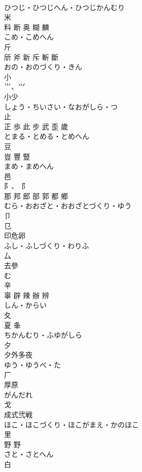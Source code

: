 \documentclass[8pt]{extreport}
\begin{document}
\begin{CJK}{UTF8}{min}
\\	ひつじ・ひつじへん・ひつじかんむり	
\\	米	
\\	料 断 奥 糊 麟	
\\	こめ・こめへん	
\\	斤	
\\	斦 斧 新 斥 斬 斷	
\\	おの・おのづくり・きん	
\\	小	
\\	⺌、⺍ 
\\	小少	
\\	しょう・ちいさい・なおがしら・つ	
\\	止	
\\	正 歩 此 步 武 歪 歲	
\\	とまる・とめる・とめへん	
\\	豆	
\\	豈 豐 豎	
\\	まめ・まめへん	
\\	邑	
\\	阝、⻏ 
\\	那 邦 郎 部 郭 都 鄉	
\\	むら・おおざと・おおざとづくり・ゆう	
\\	卩	
\\	㔾 
\\	印危卵	
\\	ふし・ふしづくり・わりふ	
\\	厶	
\\	去參	
\\	む	
\\	辛	
\\	辜 辟 辣 辦 辨	
\\	しん・からい	
\\	夂	
\\	夏 夆	
\\	ちかんむり・ふゆがしら	
\\	夕	
\\	夕外多夜	
\\	ゆう・ゆうべ・た	
\\	厂	
\\	厚原	
\\	がんだれ	
\\	戈	
\\	成式弐戦	
\\	ほこ・ほこづくり・ほこがまえ・かのほこ	
\\	里	
\\	野 野	
\\	さと・さとへん	
\\	白	

\end{CJK}
\end{document}
